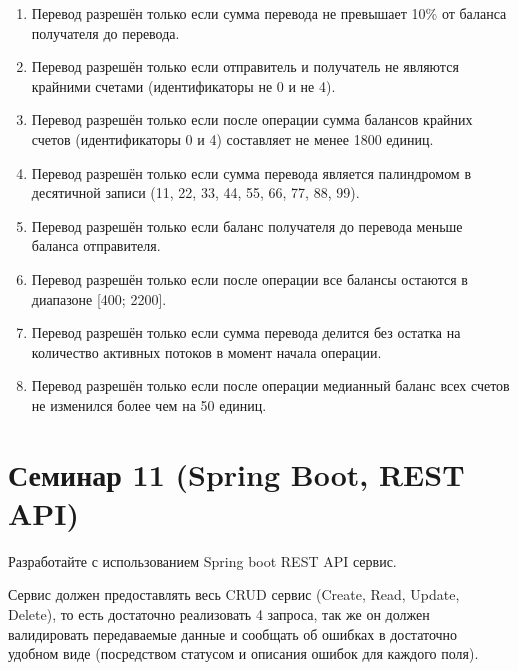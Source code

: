 \documentclass[12pt]{article}
\begin{document}
\begin{enumerate}
    \item Перевод разрешён только если сумма перевода не превышает 10\% от баланса получателя до перевода.
    \item Перевод разрешён только если отправитель и получатель не являются крайними счетами (идентификаторы не 0 и не 4).
    \item Перевод разрешён только если после операции сумма балансов крайних счетов (идентификаторы 0 и 4) составляет не менее 1800 единиц.
    \item Перевод разрешён только если сумма перевода является палиндромом в десятичной записи (11, 22, 33, 44, 55, 66, 77, 88, 99).
    \item Перевод разрешён только если баланс получателя до перевода меньше баланса отправителя.
    \item Перевод разрешён только если после операции все балансы остаются в диапазоне [400; 2200].
    \item Перевод разрешён только если сумма перевода делится без остатка на количество активных потоков в момент начала операции.
    \item Перевод разрешён только если после операции медианный баланс всех счетов не изменился более чем на 50 единиц.
\end{enumerate}

\section{Семинар 11 (Spring Boot, REST API)}

Разработайте с использованием Spring boot REST API сервис.



Сервис должен предоставлять весь CRUD сервис (Create, Read, Update, Delete), то 
есть достаточно реализовать 4 запроса, так же он должен валидировать передаваемые данные
и сообщать об ошибках в достаточно удобном виде (посредством статусом и описания ошибок
для каждого поля).
\end{document}
